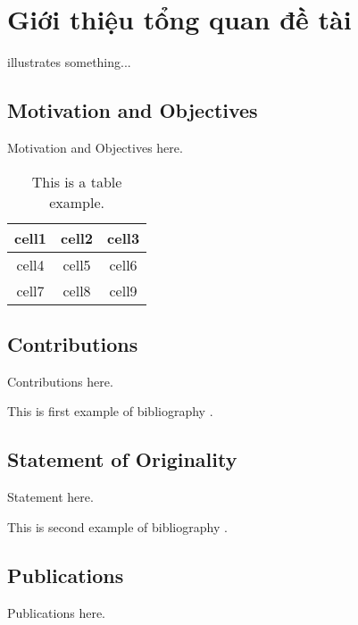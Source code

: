 \headerandfooterconfig

\ifpdf
    \graphicspath{{Chapter1/Chapter1Figs/EPS/}{Chapter1/Chapter1Figs/PDF/}{Chapter1/Chapter1Figs/}}
\else
    \graphicspath{{Chapter1/Chapter1Figs/EPS/}{Chapter1/Chapter1Figs/}}
\fi

\chapter{Giới thiệu tổng quan đề tài}

 illustrates something...

\section{Motivation and Objectives}

Motivation and Objectives here.

\begin{table}[tp]
\caption{This is a table example.}\label{tab:example}
\begin{center}
\begin{tabular}{| c | c | c |}
\hline
 cell1 & cell2 & cell3 \\ 
\hline
 cell4 & cell5 & cell6 \\ 
\hline 
 cell7 & cell8 & cell9 \\
\hline   
\end{tabular}
\end{center}
\end{table}

\section{Contributions}

Contributions here.

This is first example of bibliography \citep{ref002}.


\section{Statement of Originality}

Statement here.

This is second example of bibliography \citep{ref001}.


\section{Publications}

Publications here.

